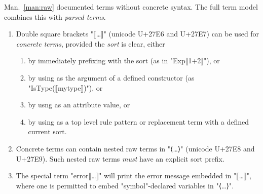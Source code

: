 \documentclass[11pt]{article} %
\begin{document}
\begin{manual}\label{man:parsed}
  Man.~\ref{man:raw} documented terms without concrete syntax. The full term model combines this
  with \emph{parsed terms}.
  \begin{enumerate}

  \item Double square brackets "⟦…⟧" (unicode U+27E6 and U+27E7) can be used for \emph{concrete
      terms}, provided the \emph{sort} is clear, either
    \begin{enumerate}
    \item by immediately prefixing with the sort (as in "Exp⟦1+2⟧"), or
    \item by using as the argument of a defined constructor (as "IsType(⟦mytype⟧)"), or
    \item by usng as an attribute value, or
    \item by using as a top level rule pattern or replacement term with a defined current sort.
    \end{enumerate}

  \item Concrete terms can contain nested raw terms in "⟨…⟩" (unicode U+27E8 and U+27E9). Such
    nested raw terms \emph{must} have an explicit sort prefix.

  \item The special term "error⟦…⟧" will print the error message embedded in "⟦…⟧", where one is
    permitted to embed "symbol"-declared variables in "⟨…⟩".

  \end{enumerate}

\end{manual}
\end{document}
